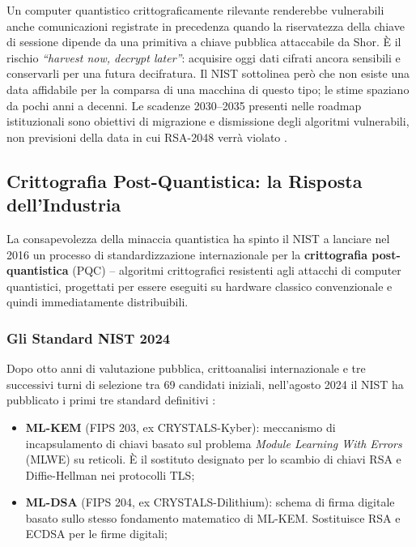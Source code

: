 \begin{onehalfspace}
Un computer quantistico crittograficamente rilevante renderebbe vulnerabili
anche comunicazioni registrate in precedenza quando la riservatezza della
chiave di sessione dipende da una primitiva a chiave pubblica attaccabile da
Shor. È il rischio \textit{``harvest now, decrypt later''}: acquisire oggi
dati cifrati ancora sensibili e conservarli per una futura decifratura.
Il \ac{NIST} sottolinea però che non esiste una data affidabile per la
comparsa di una macchina di questo tipo; le stime spaziano da pochi anni a
decenni. Le scadenze 2030--2035 presenti nelle roadmap istituzionali sono
obiettivi di migrazione e dismissione degli algoritmi vulnerabili, non
previsioni della data in cui RSA-2048 verrà violato
\cite{nist_pqc_explainer2026,nsa_cnsa2022}.

\clearpage
\subsection{Crittografia Post-Quantistica: la Risposta dell'Industria}
\label{app:intro:pqc}

La consapevolezza della minaccia quantistica ha spinto il \ac{NIST} a lanciare nel 2016 un processo di standardizzazione internazionale per la \textbf{crittografia post-quantistica} (\ac{PQC}) -- algoritmi crittografici resistenti agli attacchi di computer quantistici, progettati per essere eseguiti su hardware classico convenzionale e quindi immediatamente distribuibili.

\subsubsection{Gli Standard NIST 2024}

Dopo otto anni di valutazione pubblica, crittoanalisi internazionale e tre successivi turni di selezione tra 69 candidati iniziali, nell'agosto 2024 il NIST ha pubblicato i primi tre standard definitivi \cite{nist2024pqc}:

\begin{itemize}
    \item \textbf{ML-KEM} (FIPS 203, ex CRYSTALS-Kyber): meccanismo di incapsulamento di chiavi basato sul problema \textit{Module Learning With Errors} (MLWE) su reticoli. È il sostituto designato per lo scambio di chiavi RSA e Diffie-Hellman nei protocolli TLS;

    \item \textbf{ML-DSA} (FIPS 204, ex CRYSTALS-Dilithium): schema di firma digitale basato sullo stesso fondamento matematico di ML-KEM. Sostituisce RSA e ECDSA per le firme digitali;


\end{itemize}
\end{onehalfspace}
